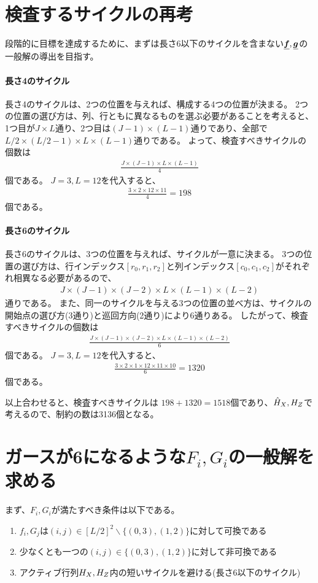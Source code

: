 \documentclass[a4paper,11pt,dvipdfmx]{jsarticle}
\theoremstyle{definition}
\begin{document}
\section{検査するサイクルの再考}
段階的に目標を達成するために、まずは長さ6以下のサイクルを含まない$\underline{\bm{f}}, \underline{\bm{g}}$の一般解の導出を目指す。
\paragraph{長さ4のサイクル}
長さ4のサイクルは、2つの位置を与えれば、構成する4つの位置が決まる。
2つの位置の選び方は、列、行ともに異なるものを選ぶ必要があることを考えると、1つ目が$J\times L$通り、2つ目は$(J-1)\times (L-1)$通りであり、全部で$L/2\times (L/2-1)\times L\times (L-1)$通りである。
よって、検査すべきサイクルの個数は
\begin{align}
  \frac{J\times (J-1)\times L\times (L-1)}{4}\label{eq:012803}
\end{align}
個である。
$J=3, L=12$を代入すると、
\begin{align}
  \frac{3\times 2\times 12\times 11}{4} = 198
\end{align}
個である。

\paragraph{長さ6のサイクル}
長さ6のサイクルは、3つの位置を与えれば、サイクルが一意に決まる。
3つの位置の選び方は、行インデックス$[r_0,r_1,r_2]$と列インデックス$[c_0,c_1,c_2]$がそれぞれ相異なる必要があるので、
\begin{align}
  J\times (J-1)\times (J-2)\times L\times (L-1)\times (L-2)
\end{align}
通りである。
また、同一のサイクルを与える3つの位置の並べ方は、サイクルの開始点の選び方(3通り)と巡回方向(2通り)により$6$通りある。
したがって、検査すべきサイクルの個数は
\begin{align}
  \frac{J\times (J-1)\times (J-2)\times L\times (L-1)\times (L-2)}{6}\label{eq:012805}
\end{align}
個である。
$J=3, L=12$を代入すると、
\begin{align}
  \frac{3\times 2\times 1\times 12\times 11\times 10}{6} = 1320
\end{align}
個である。

以上合わせると、検査すべきサイクルは
$198+1320 = 1518$個であり、$\hat{H}_X, H_Z$で考えるので、制約の数は3136個となる。

\section{ガースが6になるような$F_i, G_i$の一般解を求める}
まず、$F_i, G_i$が満たすべき条件は以下である。
\begin{enumerate}[label=\Alph*, ref=\Alph*]
  \item $f_i,G_j$は$(i,j)\in[L/2]^2\backslash\{(0,3), (1,2)\}$に対して可換である\label{cond:a}
  \item 少なくとも一つの$(i,j)\in\{(0,3), (1,2)\}$に対して非可換である\label{cond:b}
  \item アクティブ行列$H_X,H_Z$内の短いサイクルを避ける(長さ6以下のサイクル)\label{cond:c}
\end{enumerate}
\end{document}

